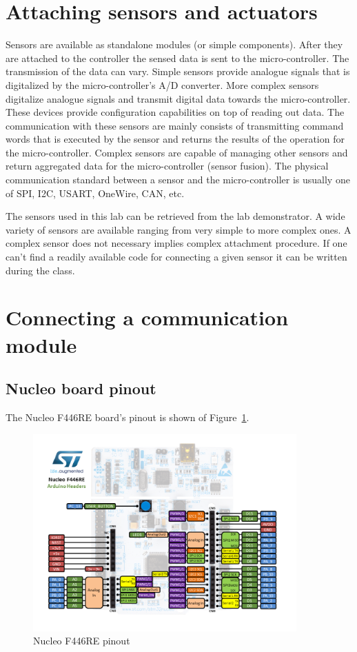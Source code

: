 \documentclass[a4paper]{article}
\begin{document}
\section{Attaching sensors and actuators}

Sensors are available as standalone modules (or simple components). After they are attached to the controller the
sensed data is sent to the micro-controller. The transmission of the data can vary. Simple sensors provide analogue
signals that is digitalized by the micro-controller's A/D converter. More complex sensors digitalize analogue signals
and transmit digital data towards the micro-controller. These devices provide configuration capabilities on top of
reading out data. The communication with these sensors are mainly consists of transmitting command words that is
executed by the sensor and returns the results of the operation for the micro-controller. Complex sensors are capable
of managing other sensors and return aggregated data for the micro-controller (sensor fusion). The physical
communication standard between a sensor and the micro-controller is usually one of SPI, I2C, USART, OneWire, CAN, etc.

The sensors used in this lab can be retrieved from the lab demonstrator. A wide variety of sensors are available
ranging from very simple to more complex ones. A complex sensor does not necessary implies complex attachment
procedure. If one can't find a readily available code for connecting a given sensor it can be written during the class.

\section{Connecting a communication module}

\subsection{Nucleo board pinout}

The Nucleo F446RE board's pinout is shown of Figure~\ref{fig:nucleo-pinout}.

\begin{figure}[H]
    \centering
    \includegraphics[width=0.9\textwidth]{figures/nucleo-pinout.png}
    \caption{Nucleo F446RE pinout}
    \label{fig:nucleo-pinout}
\end{figure}
\end{document}

